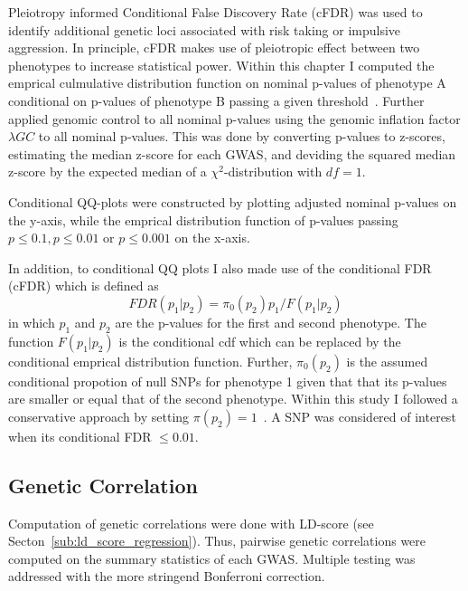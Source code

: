 Pleiotropy informed Conditional False Discovery Rate (cFDR) was used to identify additional genetic loci associated with risk taking or impulsive aggression. 
In principle, cFDR makes use of pleiotropic effect between two phenotypes to increase statistical power.
Within this chapter I computed the emprical culmulative distribution function on nominal p-values of phenotype A conditional on p-values of phenotype B passing a given threshold~\cite{Andreassen2013}.
Further applied genomic control to all nominal p-values using the genomic inflation factor $\lambda{GC}$ to all nominal p-values.
This was done by converting p-values to z-scores, estimating the median z-score for each GWAS, and deviding the squared median z-score by the expected median of a $\chi^2$-distribution  with $df=1$.

Conditional QQ-plots were constructed by plotting adjusted nominal p-values on the y-axis, while the emprical distribution function of p-values passing $p\leq0.1, p\leq 0.01$ or $ p\leq 0.001$ on the x-axis.

In addition, to conditional QQ plots I also made use of the conditional FDR (cFDR) which is defined as~\cite{Andreassen2013}
\begin{equation}
  FDR(p_1|p_2)=\pi_0(p_2)p_1/F(p_1|p_2)
\end{equation}
in which $p_1$ and $p_2$ are the p-values for the first and second phenotype.
The function $F(p_1|p_2)$ is the conditional cdf which can be replaced by the conditional emprical distribution function.
Further, $\pi_0(p_2)$ is the assumed conditional propotion of null SNPs for phenotype 1 given that that its p-values are smaller or equal that of the second phenotype.
Within this study I followed a conservative approach by setting $\pi(p_2)=1$~\citet{Andreassen2013}.
A SNP was considered of interest when its conditional FDR $\leq 0.01$.

\subsection{Genetic Correlation}
\label{sub:genetic_correlation_ukb_assoc}

Computation of genetic correlations were done with LD-score (see Secton~\ref{sub:ld_score_regression}).
Thus, pairwise genetic correlations were computed on the summary statistics of each GWAS\@.
Multiple testing was addressed with the more stringend Bonferroni correction.
